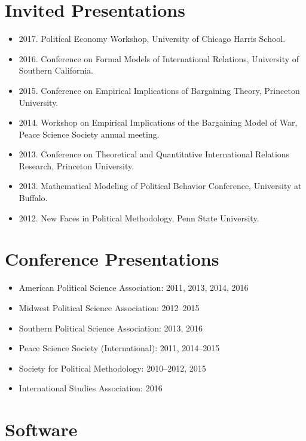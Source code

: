 \documentclass[11pt]{article}
\providecommand{\tightlist}{%
  \setlength{\itemsep}{0pt}\setlength{\parskip}{0pt}}
\begin{document}
\section{Invited Presentations}\label{invited-presentations}

\begin{itemize}
\item
  2017. Political Economy Workshop, University of Chicago Harris School.
\item
  2016. Conference on Formal Models of International Relations,
  University of Southern California.
\item
  2015. Conference on Empirical Implications of Bargaining Theory,
  Princeton University.
\item
  2014. Workshop on Empirical Implications of the Bargaining Model of
  War, Peace Science Society annual meeting.
\item
  2013. Conference on Theoretical and Quantitative International
  Relations Research, Princeton University.
\item
  2013. Mathematical Modeling of Political Behavior Conference,
  University at Buffalo.
\item
  2012. New Faces in Political Methodology, Penn State University.
\end{itemize}

\section{Conference Presentations}\label{conference-presentations}

\begin{itemize}
\tightlist
\item
  American Political Science Association: 2011, 2013, 2014, 2016
\item
  Midwest Political Science Association: 2012--2015
\item
  Southern Political Science Association: 2013, 2016
\item
  Peace Science Society (International): 2011, 2014--2015
\item
  Society for Political Methodology: 2010--2012, 2015
\item
  International Studies Association: 2016
\end{itemize}

\section{Software}\label{software}
\end{document}
